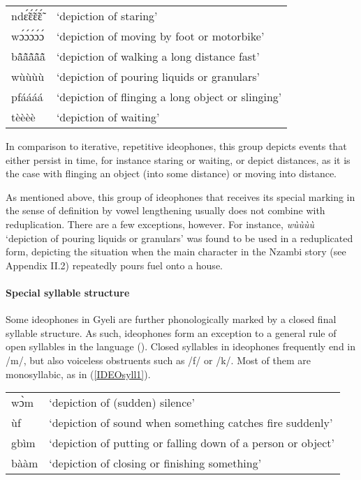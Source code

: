 \begin{exe} \ex \label{IDEOlength}
\begin{tabular}{ll}
ndɛ̃́ɛ̃́ɛ̃́ɛ̃́ & `depiction of staring' \\
wɔ́ɔ́ɔ́ɔ́ɔ́ & `depiction of moving by foot or motorbike'  \\
bã̂ã̂ã̂ã̂ã̂ & `depiction of walking a long distance fast' \\
wùùùù & `depiction of pouring liquids or granulars'  \\
pfáááá & `depiction of flinging a long object or slinging' \\
tèèèè & `depiction of waiting' \\
\end{tabular}
\end{exe} 

In comparison to iterative, repetitive ideophones, this group depicts events that either persist in time, for instance staring or waiting, or depict distances, as it is the case with flinging an object (into some distance) or moving into distance.

As mentioned above, this group of ideophones that receives its special marking in the sense of  definition by vowel lengthening usually does not combine with reduplication. There are a few exceptions, however. For instance, {\itshape wùùùù} `depiction of pouring liquids or granulars' was found to be used in a reduplicated form, depicting the situation when the main character in the Nzambi story (see Appendix II.2) repeatedly pours fuel onto a house. 


\paragraph{Special syllable structure} Some ideophones in Gyeli are further phonologically marked by a closed final syllable structure. As such, ideophones form an exception to a general rule of open syllables in the language ().
Closed syllables in ideophones frequently end in /m/, but also voiceless obstruents such as /f/ or /k/. Most of them are monosyllabic, as in (\ref{IDEOsyll1}).


\begin{exe} \ex \label{IDEOsyll1}
\begin{tabular}{ll}
wɔ̀m & `depiction of (sudden) silence' \\
ùf & `depiction of sound when something catches fire suddenly'  \\
gbìm & `depiction of putting or falling down of a person or object' \\
bààm & `depiction of closing or finishing something'  \\ 
\end{tabular}
\end{exe}

